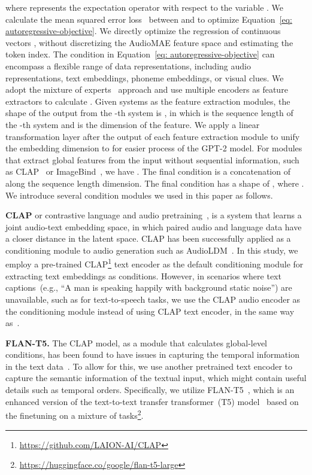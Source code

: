 \documentclass[lettersize,journal]{IEEEtran}
\begin{document}
where  represents the expectation operator with respect to the variable .
We calculate the mean squared error loss~\cite{oord2016wavenet} between  and  to optimize Equation~\eqref{eq: autoregressive-objective}. We directly optimize the regression of continuous vectors , without discretizing the AudioMAE feature space and estimating the token index. 
The condition  in Equation~\eqref{eq: autoregressive-objective} can encompass a flexible range of data representations, including audio representations, text embeddings, phoneme embeddings, or visual clues. We adopt the mixture of experts~\cite{masoudnia2014mixture} approach and use multiple encoders as feature extractors to calculate . Given  systems as the feature extraction modules, the shape of the output from the -th system  is , in which  is the sequence length of the -th system and  is the dimension of the feature. We apply a linear transformation layer after the output of each feature extraction module to unify the embedding dimension to  for easier process of the GPT-2 model. For modules that extract global features from the input without sequential information, such as CLAP~\cite{wu2023large-clap} or ImageBind~\cite{girdhar2023imagebind}, we have . The final condition  is a concatenation of  along the sequence length dimension. The final condition  has a shape of , where . We introduce several condition modules we used in this paper as follows.  

\noindent
\textbf{CLAP} or contrastive language and audio pretraining~\cite{wu2023large-clap}, is a system that learns a joint audio-text embedding space, in which paired audio and language data have a closer distance in the latent space. CLAP has been successfully applied as a conditioning module to audio generation such as AudioLDM~\cite{liu2023audioldm}. In this study, we employ a pre-trained CLAP\footnote{\url{https://github.com/LAION-AI/CLAP}} text encoder as the default conditioning module for extracting text embeddings as conditions. However, in scenarios where text captions~(e.g., ``A man is speaking happily with background static noise'') are unavailable, such as for text-to-speech tasks, we use the CLAP audio encoder as the conditioning module instead of using CLAP text encoder, in the same way as~\cite{liu2023audioldm}.



\noindent
\textbf{FLAN-T5.} The CLAP model, as a module that calculates global-level conditions, has been found to have issues in capturing the temporal information in the text data~\cite{wu2023audio}. To allow for this, we use another pretrained text encoder to capture the semantic information of the textual input, which might contain useful details such as temporal orders. Specifically, we utilize FLAN-T5~\cite{chung2022scaling-flan-t5}, which is an enhanced version of the text-to-text transfer transformer~(T5) model~\cite{raffel2020exploring} based on the finetuning on a mixture of tasks\footnote{\url{https://huggingface.co/google/flan-t5-large}}. 
\end{document}
